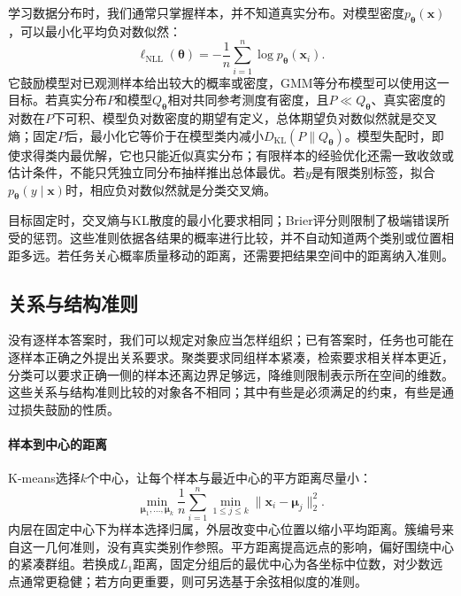 学习数据分布时，我们通常只掌握样本，并不知道真实分布。对模型密度$p_{\bm\theta}(\bm x)$，可以最小化平均负对数似然：
\begin{equation}
  \ell_{\mathrm{NLL}}(\bm{\theta})
  =-\frac{1}{n}\sum_{i=1}^{n}\log p_{\bm{\theta}}(\bm{x}_i).
  \label{eq:models-negative-log-likelihood}
\end{equation}
它鼓励模型对已观测样本给出较大的概率或密度，GMM等分布模型可以使用这一目标。若真实分布$P$和模型$Q_{\bm\theta}$相对共同参考测度有密度，且$P\ll Q_{\bm\theta}$、真实密度的对数在$P$下可积、模型负对数密度的期望有定义，总体期望负对数似然就是交叉熵；固定$P$后，最小化它等价于在模型类内减小$D_{\mathrm{KL}}(P\|Q_{\bm\theta})$。模型失配时，即使求得类内最优解，它也只能近似真实分布；有限样本的经验优化还需一致收敛或估计条件，不能只凭独立同分布抽样推出总体最优。若$y$是有限类别标签，拟合$p_{\bm\theta}(y\mid\bm x)$时，相应负对数似然就是分类交叉熵。

目标固定时，交叉熵与KL散度的最小化要求相同；Brier评分则限制了极端错误所受的惩罚。这些准则依据各结果的概率进行比较，并不自动知道两个类别或位置相距多远。若任务关心概率质量移动的距离，还需要把结果空间中的距离纳入准则。

\subsection{关系与结构准则}
\label{sec:models-spatial-objectives}

没有逐样本答案时，我们可以规定对象应当怎样组织；已有答案时，任务也可能在逐样本正确之外提出关系要求。聚类要求同组样本紧凑，检索要求相关样本更近，分类可以要求正确一侧的样本还离边界足够远，降维则限制表示所在空间的维数。这些关系与结构准则比较的对象各不相同；其中有些是必须满足的约束，有些是通过损失鼓励的性质。

\paragraph{样本到中心的距离}

K-means选择$k$个中心，让每个样本与最近中心的平方距离尽量小：
\begin{equation}
  \min_{\bm{\mu}_1,\ldots,\bm{\mu}_k}
  \frac{1}{n}\sum_{i=1}^{n}\min_{1\leq j\leq k}
  \lVert\bm{x}_i-\bm{\mu}_j\rVert_2^2.
  \label{eq:models-kmeans-objective}
\end{equation}
内层在固定中心下为样本选择归属，外层改变中心位置以缩小平均距离。簇编号来自这一几何准则，没有真实类别作参照。平方距离提高远点的影响，偏好围绕中心的紧凑群组。若换成$L_1$距离，固定分组后的最优中心为各坐标中位数，对少数远点通常更稳健；若方向更重要，则可另选基于余弦相似度的准则。

